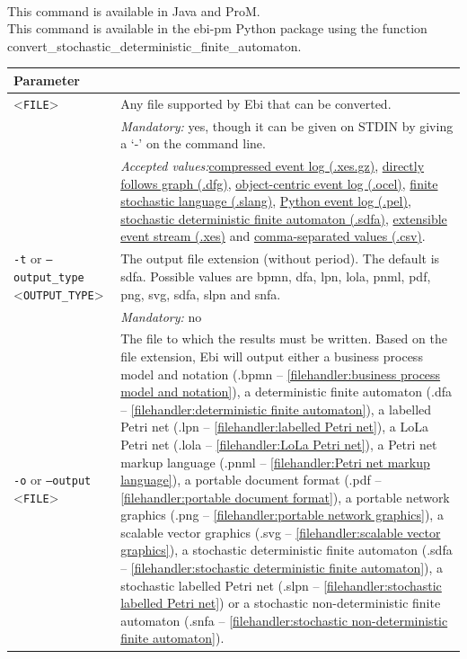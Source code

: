 {\\This command is available in Java and ProM.
\\This command is available in the ebi-pm Python package using the function convert\_stochastic\_deterministic\_finite\_automaton.
\begin{tabularx}{\linewidth}{lX}
\toprule
Parameter \\\midrule
<\texttt{FILE}>&Any file supported by Ebi that can be converted.\\
&\textit{Mandatory:} \quad yes, though it can be given on STDIN by giving a `-' on the command line.\\
&\textit{Accepted values:}\quad \hyperref[filehandler:compressed event log]{compressed event log (.xes.gz)}, \hyperref[filehandler:directly follows graph]{directly follows graph (.dfg)}, \hyperref[filehandler:object-centric event log]{object-centric event log (.ocel)}, \hyperref[filehandler:finite stochastic language]{finite stochastic language (.slang)}, \hyperref[filehandler:Python event log]{Python event log (.pel)}, \hyperref[filehandler:stochastic deterministic finite automaton]{stochastic deterministic finite automaton (.sdfa)}, \hyperref[filehandler:extensible event stream]{extensible event stream (.xes)} and \hyperref[filehandler:comma-separated values]{comma-separated values (.csv)}.\\
\texttt{-t} or \texttt{--output\_type} <\texttt{OUTPUT\_TYPE}> &
The output file extension (without period). The default is sdfa. Possible values are bpmn, dfa, lpn, lola, pnml, pdf, png, svg, sdfa, slpn and snfa.\\
&\textit{Mandatory:} \quad no\\
\texttt{-o} or \texttt{--output} <\texttt{FILE}> &
The file to which the results must be written. Based on the file extension, Ebi will output either a business process model and notation (.bpmn -- \cref{filehandler:business process model and notation}), a deterministic finite automaton (.dfa -- \cref{filehandler:deterministic finite automaton}), a labelled Petri net (.lpn -- \cref{filehandler:labelled Petri net}), a LoLa Petri net (.lola -- \cref{filehandler:LoLa Petri net}), a Petri net markup language (.pnml -- \cref{filehandler:Petri net markup language}), a portable document format (.pdf -- \cref{filehandler:portable document format}), a portable network graphics (.png -- \cref{filehandler:portable network graphics}), a scalable vector graphics (.svg -- \cref{filehandler:scalable vector graphics}), a stochastic deterministic finite automaton (.sdfa -- \cref{filehandler:stochastic deterministic finite automaton}), a stochastic labelled Petri net (.slpn -- \cref{filehandler:stochastic labelled Petri net}) or a stochastic non-deterministic finite automaton (.snfa -- \cref{filehandler:stochastic non-deterministic finite automaton}).

\end{tabularx}}
